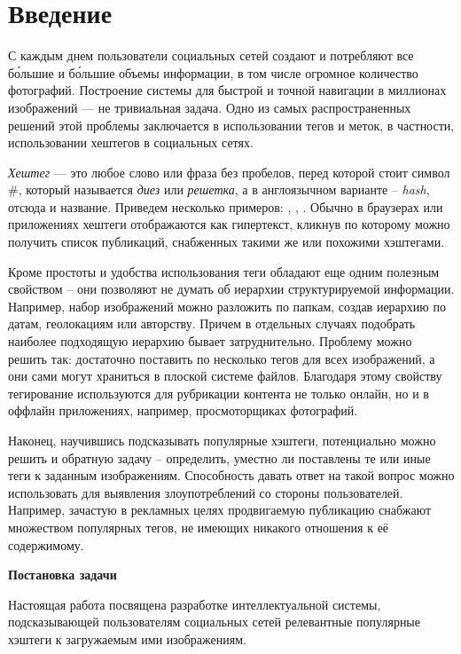 \section*{Введение}

\indent
\indent
С каждым днем пользователи социальных сетей создают и потребляют все б\'{о}льшие
и б\'{о}льшие объемы информации, в том числе огромное количество фотографий.
Построение системы для быстрой и точной навигации в миллионах изображений
 --- не тривиальная задача. Одно из самых распространенных решений этой
 проблемы заключается в использовании тегов и меток, в частности,
 использовании хештегов в социальных сетях.


\indent
\indent
\textit{Хештег} --- это любое слово или фраза без пробелов, перед которой стоит 
символ \#, который называется \textit{диез} или \textit{решетка}, а в англоязычном 
варианте -- \textit{hash}, отсюда и название. Приведем несколько примеров:
, , . Обычно в браузерах или 
приложениях хештеги отображаются как гипертекст, кликнув по которому можно 
получить список публикаций, снабженных такими же или похожими хэштегами.


\indent
\indent
Кроме простоты и удобства использования теги обладают еще одним полезным свойством 
-- они позволяют не думать об  иерархии структурируемой информации. 
Например, набор изображений можно разложить
по папкам, создав иерархию по датам, геолокациям или авторству. Причем в отдельных
случаях подобрать наиболее подходящую иерархию бывает затруднительно. Проблему
можно решить так: достаточно поставить по несколько тегов для всех изображений,
а они сами могут храниться в плоской системе файлов.
Благодаря этому свойству тегирование используются  для рубрикации контента 
не только онлайн, но и в оффлайн приложениях, например, 
просмоторщиках фотографий. 


\indent
\indent
Наконец, научившись подсказывать популярные хэштеги,
потенциально можно решить и 
обратную задачу -- определить,
уместно ли поставлены те или иные теги к заданным изображениям. 
Способность давать ответ на такой вопрос можно использовать для 
выявления злоупотреблений со стороны пользователей. Например, зачастую
 в рекламных целях продвигаемую публикацию снабжают множеством популярных 
тегов, не имеющих никакого отношения к её содержимому.


\indent
\indent
\textbf{Постановка задачи}

\indent
\indent
Настоящая работа посвящена разработке интеллектуальной системы, 
подсказывающей пользователям социальных сетей 
релевантные популярные хэштеги к загружаемым ими изображениям.


